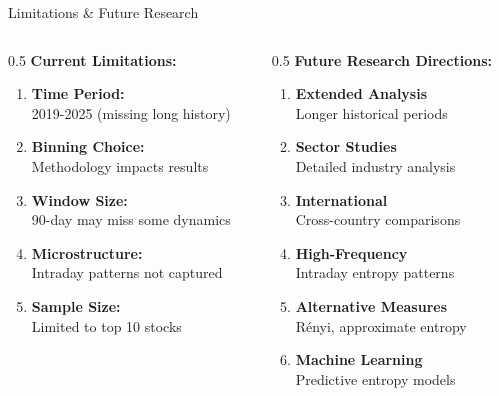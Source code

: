 \documentclass[aspectratio=169,12pt,xcolor=table]{beamer}
\begin{document}
\begin{frame}{Limitations \& Future Research}
\begin{columns}[T]
\begin{column}{0.5\textwidth}
    \textbf{Current Limitations:}
    \begin{enumerate}
        \item \textbf{Time Period:} \\
        2019-2025 (missing long history)
        
        \item \textbf{Binning Choice:} \\
        Methodology impacts results
        
        \item \textbf{Window Size:} \\
        90-day may miss some dynamics
        
        \item \textbf{Microstructure:} \\
        Intraday patterns not captured
        
        \item \textbf{Sample Size:} \\
        Limited to top 10 stocks
    \end{enumerate}
\end{column}

\begin{column}{0.5\textwidth}
    \textbf{Future Research Directions:}
    \begin{enumerate}
        \item \textcolor{niftyblue}{\textbf{Extended Analysis}} \\
        Longer historical periods
        
        \item \textcolor{niftygreen}{\textbf{Sector Studies}} \\
        Detailed industry analysis
        
        \item \textcolor{niftyorange}{\textbf{International}} \\
        Cross-country comparisons
        
        \item \textcolor{niftyred}{\textbf{High-Frequency}} \\
        Intraday entropy patterns
        
        \item \textcolor{niftyblue}{\textbf{Alternative Measures}} \\
        Rényi, approximate entropy
        
        \item \textcolor{niftygreen}{\textbf{Machine Learning}} \\
        Predictive entropy models
    \end{enumerate}
\end{column}
\end{columns}
\end{frame}
\end{document}
